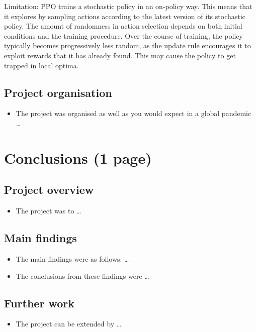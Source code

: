 \documentclass[12pt,a4paper]{article}
\begin{document}
Limitation: PPO trains a stochastic policy in an on-policy way. This means that it
explores by sampling actions according to the latest version of its
stochastic policy. The amount of randomness in action selection depends
on both initial conditions and the training procedure. Over the course
of training, the policy typically becomes progressively less random, as
the update rule encourages it to exploit rewards that it has already
found. This may cause the policy to get trapped in local optima.

\subsection{Project organisation}
\begin{itemize}
    \item The project was organised as well as you would expect in a global pandemic \dots
\end{itemize}

\section{Conclusions (1 page)}
\subsection{Project overview}
\begin{itemize}
    \item The project was to \dots
\end{itemize}

\subsection{Main findings}
\begin{itemize}
    \item The main findings were as follows: \dots
    \item The conclusions from these findings were \dots
\end{itemize}

\subsection{Further work}
\begin{itemize}
    \item The project can be extended by \dots
\end{itemize}

\cite{}

\end{document}
